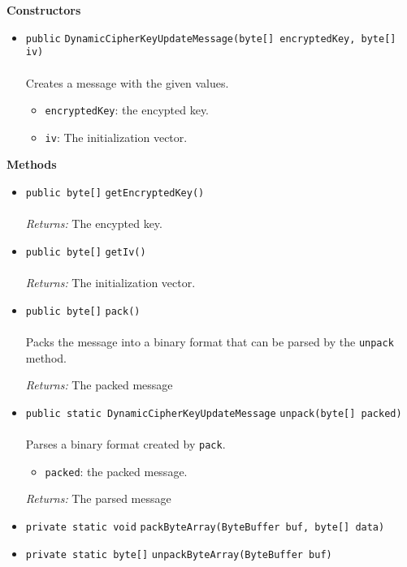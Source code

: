 \textbf{\sffamily Constructors}
\begin{itemize}
\item \lstinline|public| \lstinline|DynamicCipherKeyUpdateMessage|\lstinline|(byte[] encryptedKey, byte[] iv)|\\ \\[-0.6em]
Creates a message with the given values.
\begin{itemize}
\item \lstinline|encryptedKey|: the encypted key.
\item \lstinline|iv|: The initialization vector.
\end{itemize}



\end{itemize}


\textbf{\sffamily Methods}
\begin{itemize}
\item \lstinline|public byte[]| \lstinline|getEncryptedKey|\lstinline|()|\\ \\[-0.6em]
\emph{Returns:} The encypted key.



\item \lstinline|public byte[]| \lstinline|getIv|\lstinline|()|\\ \\[-0.6em]
\emph{Returns:} The initialization vector.



\item \lstinline|public byte[]| \lstinline|pack|\lstinline|()|\\ \\[-0.6em]
Packs the message into a binary format that can be parsed
 by the \lstinline|unpack| method.

\emph{Returns:} The packed message

\item \lstinline|public static DynamicCipherKeyUpdateMessage| \lstinline|unpack|\lstinline|(byte[] packed)|\\ \\[-0.6em]
Parses a binary format created by \lstinline|pack|.
\begin{itemize}
\item \lstinline|packed|: the packed message.
\end{itemize}

\emph{Returns:} The parsed message

\item \lstinline|private static void| \lstinline|packByteArray|\lstinline|(ByteBuffer buf, byte[] data)| \\[-0.6em]




\item \lstinline|private static byte[]| \lstinline|unpackByteArray|\lstinline|(ByteBuffer buf)| \\[-0.6em]




\end{itemize}

